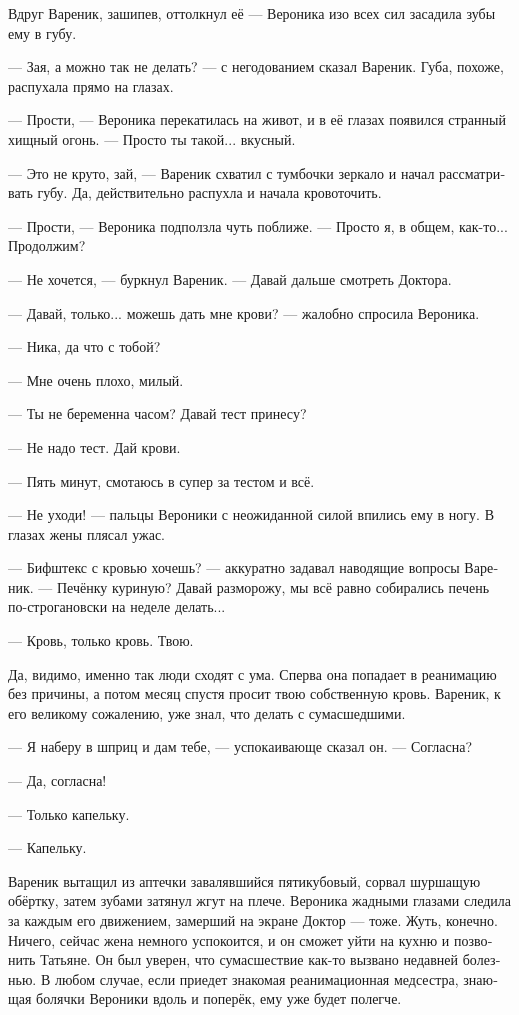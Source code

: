 \documentclass[a5paper,12pt,fleqn]{extbook}\usepackage{cooltooltips}\usepackage{polyglossia}\setdefaultlanguage[babelshorthands=true]{russian}\setotherlanguage{english}\defaultfontfeatures{Ligatures=TeX,Mapping=tex-text} \usepackage{xcolor}\definecolor{lightgray}{HTML}{bbbbbb}\color{lightgray}\newcommand{\ml}[3]{\textenglish{\textcolor{black}{#3}}}
\begin{document}
Вдруг Вареник, зашипев, оттолкнул её --- Вероника изо всех сил засадила зубы ему в губу.

--- Зая, а можно так не делать? --- с негодованием сказал Вареник.
Губа, похоже, распухала прямо на глазах.

--- Прости, --- Вероника перекатилась на живот, и в её глазах появился странный хищный огонь.
--- Просто ты такой... вкусный.

--- Это не круто, зай, --- Вареник схватил с тумбочки зеркало и начал рассматривать губу.
Да, действительно распухла и начала кровоточить.

--- Прости, --- Вероника подползла чуть поближе.
--- Просто я, в общем, как-то...
Продолжим?

--- Не хочется, --- буркнул Вареник.
--- Давай дальше смотреть Доктора.

--- Давай, только... можешь дать мне крови? --- жалобно спросила Вероника.

--- Ника, да что с тобой?

--- Мне очень плохо, милый.

--- Ты не беременна часом?
Давай тест принесу?

--- Не надо тест.
Дай крови.

--- Пять минут, смотаюсь в супер за тестом и всё.

--- Не уходи! --- пальцы Вероники с неожиданной силой впились ему в ногу.
В глазах жены плясал ужас.

--- Бифштекс с кровью хочешь? --- аккуратно задавал наводящие вопросы Вареник.
--- Печёнку куриную?
Давай разморожу, мы всё равно собирались печень по-строгановски на неделе делать...

--- Кровь, только кровь.
Твою.

Да, видимо, именно так люди сходят с ума.
Сперва она попадает в реанимацию без причины, а потом месяц спустя просит твою собственную кровь.
Вареник, к его великому сожалению, уже знал, что делать с сумасшедшими.

--- Я наберу в шприц и дам тебе, --- успокаивающе сказал он.
--- Согласна?

--- Да, согласна!

--- Только капельку.

--- Капельку.

Вареник вытащил из аптечки завалявшийся пятикубовый, сорвал шуршащую обёртку, затем зубами затянул жгут на плече.
Вероника жадными глазами следила за каждым его движением, замерший на экране Доктор --- тоже.
Жуть, конечно.
Ничего, сейчас жена немного успокоится, и он сможет уйти на кухню и позвонить Татьяне.
Он был уверен, что сумасшествие как-то вызвано недавней болезнью.
В любом случае, если приедет знакомая реанимационная медсестра, знающая болячки Вероники вдоль и поперёк, ему уже будет полегче.
\end{document}
